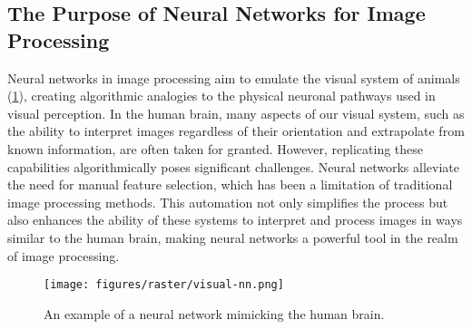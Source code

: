 \subsection{The Purpose of Neural Networks for Image Processing}

Neural networks in image processing aim to emulate the visual system of animals (\cref{fig:nn-purpose-zebra}), creating algorithmic analogies to the physical neuronal pathways used in visual perception.
In the human brain, many aspects of our visual system, such as the ability to interpret images regardless of their orientation and extrapolate from known information, are often taken for granted.
However, replicating these capabilities algorithmically poses significant challenges.
Neural networks alleviate the need for manual feature selection, which has been a limitation of traditional image processing methods.
This automation not only simplifies the process but also enhances the ability of these systems to interpret and process images in ways similar to the human brain, making neural networks a powerful tool in the realm of image processing.


\begin{figure}[h!]
  \centering
  \texttt{[image: figures/raster/visual-nn.png]}
  \caption{An example of a neural network mimicking the human brain.}
  \label{fig:nn-purpose-zebra}
\end{figure}

